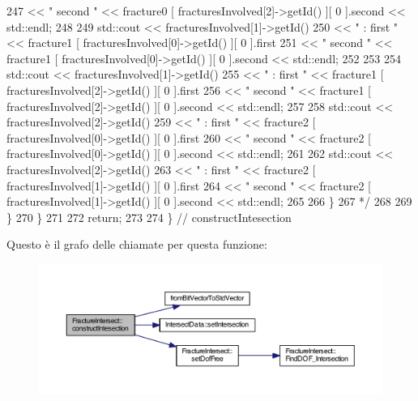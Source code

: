 \begin{DoxyCode}
247 \textcolor{comment}{                                << " second " << fracture0 [ fracturesInvolved[2]->getId() ][ 0 ].second <<
       std::endl;}
248 \textcolor{comment}{    }
249 \textcolor{comment}{                std::cout << fracturesInvolved[1]->getId()}
250 \textcolor{comment}{                                << " :   first " << fracture1 [ fracturesInvolved[0]->getId() ][ 0 ].first}
251 \textcolor{comment}{                                << " second " << fracture1 [ fracturesInvolved[0]->getId() ][ 0 ].second <<
       std::endl;}
252 \textcolor{comment}{    }
253 \textcolor{comment}{    }
254 \textcolor{comment}{                std::cout << fracturesInvolved[1]->getId()}
255 \textcolor{comment}{                                << " :   first " << fracture1 [ fracturesInvolved[2]->getId() ][ 0 ].first}
256 \textcolor{comment}{                                << " second " << fracture1 [ fracturesInvolved[2]->getId() ][ 0 ].second <<
       std::endl;}
257 \textcolor{comment}{    }
258 \textcolor{comment}{                std::cout << fracturesInvolved[2]->getId()}
259 \textcolor{comment}{                                << " :   first " << fracture2 [ fracturesInvolved[0]->getId() ][ 0 ].first}
260 \textcolor{comment}{                                << " second " << fracture2 [ fracturesInvolved[0]->getId() ][ 0 ].second <<
       std::endl;}
261 \textcolor{comment}{    }
262 \textcolor{comment}{                std::cout << fracturesInvolved[2]->getId()}
263 \textcolor{comment}{                                << " :   first " << fracture2 [ fracturesInvolved[1]->getId() ][ 0 ].first}
264 \textcolor{comment}{                                << " second " << fracture2 [ fracturesInvolved[1]->getId() ][ 0 ].second <<
       std::endl;}
265 \textcolor{comment}{    }
266 \textcolor{comment}{            \}}
267 \textcolor{comment}{            */}
268 
269         \}
270     \}
271     
272     \textcolor{keywordflow}{return};
273 
274 \} \textcolor{comment}{// constructIntesection}
\end{DoxyCode}


Questo è il grafo delle chiamate per questa funzione\-:\nopagebreak
\begin{figure}[H]
\begin{center}
\leavevmode
\includegraphics[width=350pt]{classFractureIntersect_a776675c1805c35046d26a5f2bf6b1f34_cgraph}
\end{center}
\end{figure}


